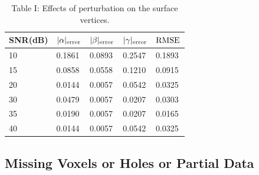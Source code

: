 \documentclass{UCF_ETD}
\begin{document}
\begin{table}
\begin{center}

\caption{Table I: Effects of perturbation on the surface vertices.}
    \begin{tabular}{| l | l | l | l | l |}
    \hline
    SNR(dB) & $|\alpha|_{\rm error}$ & $|\beta|_{\rm error}$ & $|\gamma|_{\rm error}$ & $\rm RMSE$ \\ \hline
    10 & 0.1861 & 0.0893 & 0.2547 & 0.1893 \\ \hline
    15 & 0.0858 & 0.0558 & 0.1210 & 0.0915 \\ \hline
    20 & 0.0144 & 0.0057 & 0.0542 & 0.0325 \\ \hline
    30 & 0.0479 & 0.0057 & 0.0207 & 0.0303\\ \hline
    35 & 0.0190 & 0.0057 & 0.0207 & 0.0165 \\ \hline
    40 & 0.0144 & 0.0057 & 0.0542 & 0.0325\\ \hline
    \end{tabular}
\end{center}
\end{table}


\subsection{Missing Voxels or Holes or Partial Data } \label{MissingVoxelDataExp}
\end{document}
